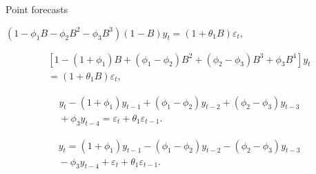 \documentclass[14pt,ignorenonframetext,]{beamer}
\begin{document}
\begin{frame}{Point forecasts}

\fontsize{14}{14}\sf


\begin{block}{}
\centerline{$(1-\phi_1B -\phi_2B^2-\phi_3B^3)(1-B) y_t = (1+\theta_1B)\varepsilon_{t},$}
\end{block}

\pause\vspace*{-0.4cm}

\begin{align*}
\left[1-(1+\phi_1)B +(\phi_1-\phi_2)B^2 + (\phi_2-\phi_3)B^3 +\phi_3B^4\right] y_t\\ = (1+\theta_1B)\varepsilon_{t},
\end{align*}

\pause\vspace*{-0.4cm}

\begin{align*}
y_t - (1+\phi_1)y_{t-1} +(\phi_1-\phi_2)y_{t-2} + (\phi_2-\phi_3)y_{t-3}\\ \mbox{}+\phi_3y_{t-4} = \varepsilon_t+\theta_1\varepsilon_{t-1}.
\end{align*}

\pause\vspace*{-0.4cm}

\begin{align*}
y_t = (1+\phi_1)y_{t-1} -(\phi_1-\phi_2)y_{t-2} - (\phi_2-\phi_3)y_{t-3}\\\mbox{} -\phi_3y_{t-4} + \varepsilon_t+\theta_1\varepsilon_{t-1}.
\end{align*}

\end{frame}
\end{document}
